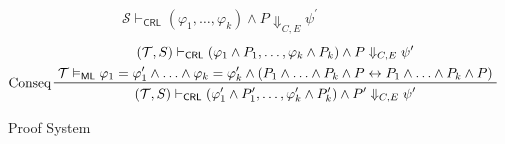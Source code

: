 \documentclass{article}
\newcommand{\ML}{\mathsf{ML}}
\newcommand{\CRL}{\mathsf{CRL}}
\begin{document}
\begin{figure}
\begin{align*}
      { \mathcal{S} \vdash_\CRL (\varphi_1, \ldots, \varphi_k) \land P \Downarrow_{C, E} \psi^\prime}
    \end{align*}
    \begin{align*}
    & \prftree[l]{Conseq}
      { \prfStackPremises
        { (\mathcal{T}, S) \vdash_\CRL (\varphi_1 \land P_1, \ldots, \varphi_k \land P_k) \land P \Downarrow_{C, E} \psi^\prime}
        { \mathcal{T} \vDash_\ML \varphi_1 = \varphi_1^\prime \land \ldots \land \varphi_k = \varphi_k^\prime
        \land (P_1 \land \ldots \land P_k \land P \leftrightarrow P_1 \land \ldots \land P_k \land P) }
      }
      { (\mathcal{T}, S) \vdash_\CRL (\varphi_1^\prime \land P_1^\prime, \ldots, \varphi_k^\prime \land P_k^\prime) \land P^\prime \Downarrow_{C, E} \psi^\prime}
    \end{align*}
    \caption{Proof System}
    \label{fig:my_label}
\end{figure}
\end{document}
